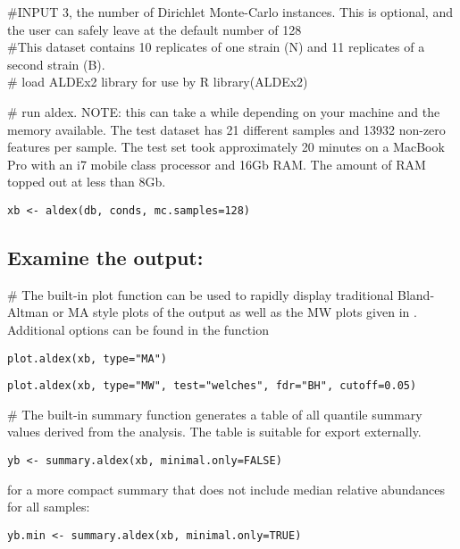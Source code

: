 \documentclass[11pt]{amsart}
\begin{document}
\noindent\#INPUT 3, the number of Dirichlet Monte-Carlo instances. This is optional, and the user can safely leave at the default number of 128\\

\noindent\#This dataset contains 10 replicates of one strain (N) and 11 replicates of a second strain (B).\\

\noindent \#  load ALDEx2 library for use by R
\noindent\textsf{library(ALDEx2)}


\noindent \#  run aldex. NOTE: this can take a while depending on your machine and the memory available. The test dataset  has 21 different samples and  13932 non-zero features per sample. The test set took approximately 20 minutes on a MacBook Pro with an i7 mobile class processor and 16Gb RAM. The amount of RAM topped out at less than 8Gb.  \\

\begin{verbatim}xb <- aldex(db, conds, mc.samples=128)
\end{verbatim}

\subsection*{Examine the output:}
\noindent\#  The built-in plot function can be used to rapidly display traditional Bland-Altman or MA style plots of the output as well as the MW plots given in \cite{fernandes:2013}. Additional options can be found in the function\\
\noindent\begin{verbatim}plot.aldex(xb, type="MA")\end{verbatim}
\noindent\begin{verbatim}plot.aldex(xb, type="MW", test="welches", fdr="BH", cutoff=0.05)\end{verbatim}

\noindent\#  The built-in summary function generates a table of all quantile summary values derived from the analysis. The table is suitable for export externally. \\

\noindent\begin{verbatim}yb <- summary.aldex(xb, minimal.only=FALSE)\end{verbatim}
for a more compact summary that does not include median relative abundances for all samples:\\
\noindent\begin{verbatim}yb.min <- summary.aldex(xb, minimal.only=TRUE)\end{verbatim}
\end{document}
